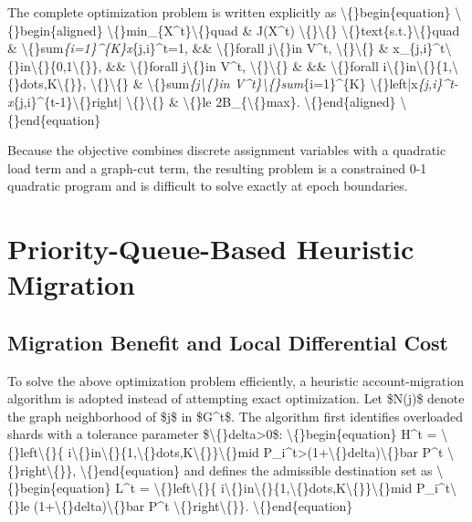 \documentclass{article}
\begin{document}
The complete optimization problem is written explicitly as
\textbackslash\{\}begin\{equation\}
\textbackslash\{\}begin\{aligned\}
\textbackslash\{\}min\_\{X^t\}\textbackslash\{\}quad
\& J(X^t) \textbackslash\{\}\textbackslash\{\}
\textbackslash\{\}text\{s.t.\}\textbackslash\{\}quad
\& \textbackslash\{\}sum\emph{\{i=1\}^\{K\}x}\{j,i\}^t=1,
\&\& \textbackslash\{\}forall j\textbackslash\{\}in V^t, \textbackslash\{\}\textbackslash\{\}
\& x\_\{j,i\}^t\textbackslash\{\}in\textbackslash\{\}\{0,1\textbackslash\{\}\},
\&\& \textbackslash\{\}forall j\textbackslash\{\}in V^t, \textbackslash\{\}\textbackslash\{\}
\& \&\& \textbackslash\{\}forall i\textbackslash\{\}in\textbackslash\{\}\{1,\textbackslash\{\}dots,K\textbackslash\{\}\}, \textbackslash\{\}\textbackslash\{\}
\& \textbackslash\{\}sum\emph{\{j\textbackslash\{\}in V^t\}\textbackslash\{\}sum}\{i=1\}^\{K\}
\textbackslash\{\}left|x\emph{\{j,i\}^t-x}\{j,i\}^\{t-1\}\textbackslash\{\}right| \textbackslash\{\}\textbackslash\{\}
\& \textbackslash\{\}le 2B\_\{\textbackslash\{\}max\}.
\textbackslash\{\}end\{aligned\}
\textbackslash\{\}end\{equation\}

Because the objective combines discrete assignment variables with a quadratic load term and a graph-cut term, the resulting problem is a constrained 0-1 quadratic program and is difficult to solve exactly at epoch boundaries.

\section{Priority-Queue-Based Heuristic Migration}\label{sec:priority-queue-based-heuristic-migration}



\subsection{Migration Benefit and Local Differential Cost}\label{sec:migration-benefit-and-local-differential-cost}

To solve the above optimization problem efficiently, a heuristic account-migration algorithm is adopted instead of attempting exact optimization. Let \$N(j)\$ denote the graph neighborhood of \$j\$ in \$G^t\$. The algorithm first identifies overloaded shards with a tolerance parameter \$\textbackslash\{\}delta>0\$:
\textbackslash\{\}begin\{equation\}
H^t
=
\textbackslash\{\}left\textbackslash\{\}\{
i\textbackslash\{\}in\textbackslash\{\}\{1,\textbackslash\{\}dots,K\textbackslash\{\}\}\textbackslash\{\}mid P\_i^t>(1+\textbackslash\{\}delta)\textbackslash\{\}bar P^t
\textbackslash\{\}right\textbackslash\{\}\},
\textbackslash\{\}end\{equation\}
and defines the admissible destination set as
\textbackslash\{\}begin\{equation\}
L^t
=
\textbackslash\{\}left\textbackslash\{\}\{
i\textbackslash\{\}in\textbackslash\{\}\{1,\textbackslash\{\}dots,K\textbackslash\{\}\}\textbackslash\{\}mid P\_i^t\textbackslash\{\}le (1+\textbackslash\{\}delta)\textbackslash\{\}bar P^t
\textbackslash\{\}right\textbackslash\{\}\}.
\textbackslash\{\}end\{equation\}
\end{document}
